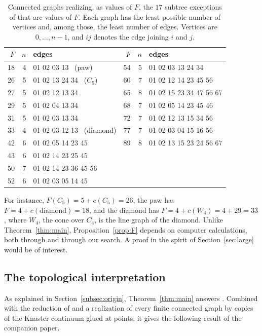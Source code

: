\documentclass[11pt]{amsart}
\theoremstyle{definition}
\theoremstyle{remark}
\begin{document}
\begin{table}[ht]
\centering
\small
\begin{tabular}{rrl@{\qquad}rrl}
\toprule
$F$ & $n$ & edges & $F$ & $n$ & edges\\
\midrule
18 & 4 & 01 02 03 13 \ (paw) & 54 & 5 & 01 02 03 13 24 34\\
26 & 5 & 01 02 13 24 34 \ ($C_5$) & 60 & 7 & 01 02 12 14 23 45 56\\
27 & 5 & 01 02 12 13 34 & 65 & 8 & 01 02 15 23 34 47 56 67\\
29 & 5 & 01 02 04 13 34 & 68 & 7 & 01 02 05 14 23 45 46\\
31 & 5 & 01 02 03 13 34 & 72 & 7 & 01 02 12 13 15 34 56\\
33 & 4 & 01 02 03 12 13 \ (diamond) & 77 & 7 & 01 02 03 04 15 16 56\\
42 & 6 & 01 02 05 14 23 45 & 89 & 8 & 01 02 13 15 23 24 56 67\\
43 & 6 & 01 02 14 23 25 45 & & & \\
50 & 7 & 01 02 14 23 36 45 56 & & & \\
52 & 6 & 01 02 03 05 14 45 & & & \\
\bottomrule
\end{tabular}
\caption{Connected graphs realizing, as values of $F$, the $17$ subtree exceptions of \cite{CSW} that are values of $F$. Each graph has the least possible number of vertices and, among those, the least number of edges. Vertices are $0,\dots,n-1$, and $ij$ denotes the edge joining $i$ and $j$.}
\label{tab:F}
\end{table}

For instance, $F(C_5)=5+c(C_5)=26$, the paw has $F=4+c(\text{diamond})=18$, and the diamond has $F=4+c(W_4)=4+29=33$, where $W_4$, the cone over $C_4$, is the line graph of the diamond. Unlike Theorem~\ref{thm:main}, Proposition~\ref{prop:F} depends on computer calculations, both through \cite{CSW} and through our search. A proof in the spirit of Section~\ref{sec:large} would be of interest.

\subsection{The topological interpretation}
As explained in Section~\ref{subsec:origin}, Theorem~\ref{thm:main} answers \cite[Question~3.21]{CORa}. Combined with the reduction of \cite{CORa} and a realization of every finite connected graph by copies of the Knaster continuum glued at points, it gives the following result of the companion paper.
\end{document}
